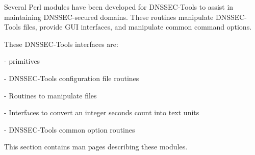
Several Perl modules have been developed for DNSSEC-Tools to assist in
maintaining DNSSEC-secured domains.  These routines manipulate DNSSEC-Tools
files, provide GUI interfaces, and manipulate common command options.

These DNSSEC-Tools interfaces are:

\begin{description}

\item{} -  primitives

\item{} - DNSSEC-Tools configuration file routines

\item{} - Routines to manipulate  files

\item{} - Interfaces to convert an integer seconds
count into text units

\item{} - DNSSEC-Tools common option routines

\end{description}

This section contains man pages describing these modules.






